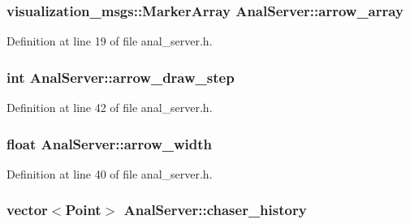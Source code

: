 \subsubsection[{\texorpdfstring{arrow\+\_\+array}{arrow_array}}]{\setlength{\rightskip}{0pt plus 5cm}visualization\+\_\+msgs\+::\+Marker\+Array Anal\+Server\+::arrow\+\_\+array}\hypertarget{class_anal_server_a2d15670b94e2cdb4c3e3657378ad3a8c}{}\label{class_anal_server_a2d15670b94e2cdb4c3e3657378ad3a8c}


Definition at line 19 of file anal\+\_\+server.\+h.

\subsubsection[{\texorpdfstring{arrow\+\_\+draw\+\_\+step}{arrow_draw_step}}]{\setlength{\rightskip}{0pt plus 5cm}int Anal\+Server\+::arrow\+\_\+draw\+\_\+step}\hypertarget{class_anal_server_a7df3e7d417439f5159feb25fdb11b218}{}\label{class_anal_server_a7df3e7d417439f5159feb25fdb11b218}


Definition at line 42 of file anal\+\_\+server.\+h.

\subsubsection[{\texorpdfstring{arrow\+\_\+width}{arrow_width}}]{\setlength{\rightskip}{0pt plus 5cm}float Anal\+Server\+::arrow\+\_\+width}\hypertarget{class_anal_server_ae61096e92e5fa0eaec6ee96511eaf1ac}{}\label{class_anal_server_ae61096e92e5fa0eaec6ee96511eaf1ac}


Definition at line 40 of file anal\+\_\+server.\+h.

\subsubsection[{\texorpdfstring{chaser\+\_\+history}{chaser_history}}]{\setlength{\rightskip}{0pt plus 5cm}vector$<$Point$>$ Anal\+Server\+::chaser\+\_\+history}\hypertarget{class_anal_server_a0e5ae7020588fe8c8a56fef094a8da7c}{}\label{class_anal_server_a0e5ae7020588fe8c8a56fef094a8da7c}


